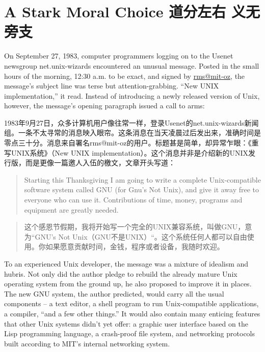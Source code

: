 \chapter{\ifdefined\eng
A Stark Moral Choice
\fi
\ifdefined\chs
道分左右 义无旁支
\fi}

\ifdefined\eng
On September 27, 1983, computer programmers logging on to the Usenet newsgroup net.unix-wizards encountered an unusual message. Posted in the small hours of the morning, 12:30 a.m. to be exact, and signed by \url{rms@mit-oz}, the message's subject line was terse but attention-grabbing. ``New UNIX implementation,'' it read. Instead of introducing a newly released version of Unix, however, the message's opening paragraph issued a call to arms:
\fi

\ifdefined\chs
1983年9月27日，众多计算机用户像往常一样，登录Usenet的net.unix-wizards新闻组。一条不太寻常的消息映入眼帘。这条消息在当天凌晨过后发出来，准确时间是零点三十分。消息来自署名rms@mit-oz的用户。标题甚是简单，却异常乍眼：《重写UNIX系统》（New UNIX implementation）。这个消息并非是介绍新的UNIX发行版，而是更像一篇邀人入伍的檄文，文章开头写道：
\fi

\ifdefined\eng
\begin{quote}
Starting this Thanksgiving I am going to write a complete Unix-compatible software system called GNU (for Gnu's Not Unix), and give it away free to everyone who can use it. Contributions of time, money, programs and equipment are greatly needed.
\end{quote}
\fi

\ifdefined\chs
\begin{quote}
这个感恩节假期，我将开始写一个完全的UNIX兼容系统，叫做GNU，意为“GNU's Not Unix（GNU不是UNIX）“。这个系统任何人都可以自由使用。你如果愿意贡献时间，金钱，程序或者设备，我随时欢迎。
\end{quote}
\fi

\ifdefined\eng
To an experienced Unix developer, the message was a mixture of idealism and hubris. Not only did the author pledge to rebuild the already mature Unix operating system from the ground up, he also proposed to improve it in places. The new GNU system, the author predicted, would carry all the usual components -- a text editor, a shell program to run Unix-compatible applications, a compiler, ``and a few other things.'' It would also contain many enticing features that other Unix systems didn't yet offer: a graphic user interface based on the Lisp programming language, a crash-proof file system, and networking protocols built according to MIT's internal networking system.
\fi

